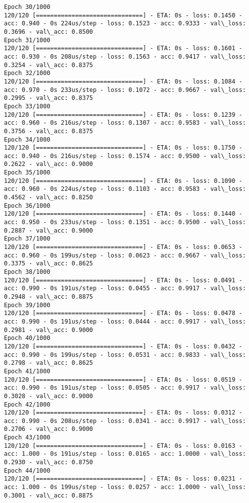 \documentclass[11pt]{article}
\begin{document}
\begin{Verbatim}[commandchars=\\\{\}]
Epoch 30/1000
120/120 [==============================] - ETA: 0s - loss: 0.1450 - acc: 0.940 - 0s 224us/step - loss: 0.1523 - acc: 0.9333 - val\_loss: 0.3696 - val\_acc: 0.8500
Epoch 31/1000
120/120 [==============================] - ETA: 0s - loss: 0.1601 - acc: 0.930 - 0s 208us/step - loss: 0.1563 - acc: 0.9417 - val\_loss: 0.3254 - val\_acc: 0.8375
Epoch 32/1000
120/120 [==============================] - ETA: 0s - loss: 0.1084 - acc: 0.970 - 0s 233us/step - loss: 0.1072 - acc: 0.9667 - val\_loss: 0.2995 - val\_acc: 0.8375
Epoch 33/1000
120/120 [==============================] - ETA: 0s - loss: 0.1239 - acc: 0.960 - 0s 216us/step - loss: 0.1307 - acc: 0.9583 - val\_loss: 0.3756 - val\_acc: 0.8375
Epoch 34/1000
120/120 [==============================] - ETA: 0s - loss: 0.1750 - acc: 0.940 - 0s 216us/step - loss: 0.1574 - acc: 0.9500 - val\_loss: 0.2622 - val\_acc: 0.9000
Epoch 35/1000
120/120 [==============================] - ETA: 0s - loss: 0.1090 - acc: 0.960 - 0s 224us/step - loss: 0.1103 - acc: 0.9583 - val\_loss: 0.4562 - val\_acc: 0.8250
Epoch 36/1000
120/120 [==============================] - ETA: 0s - loss: 0.1440 - acc: 0.950 - 0s 233us/step - loss: 0.1351 - acc: 0.9500 - val\_loss: 0.2887 - val\_acc: 0.9000
Epoch 37/1000
120/120 [==============================] - ETA: 0s - loss: 0.0653 - acc: 0.960 - 0s 199us/step - loss: 0.0623 - acc: 0.9667 - val\_loss: 0.3375 - val\_acc: 0.8625
Epoch 38/1000
120/120 [==============================] - ETA: 0s - loss: 0.0491 - acc: 0.990 - 0s 191us/step - loss: 0.0455 - acc: 0.9917 - val\_loss: 0.2948 - val\_acc: 0.8875
Epoch 39/1000
120/120 [==============================] - ETA: 0s - loss: 0.0478 - acc: 0.990 - 0s 191us/step - loss: 0.0444 - acc: 0.9917 - val\_loss: 0.2981 - val\_acc: 0.9000
Epoch 40/1000
120/120 [==============================] - ETA: 0s - loss: 0.0432 - acc: 0.990 - 0s 199us/step - loss: 0.0531 - acc: 0.9833 - val\_loss: 0.2798 - val\_acc: 0.8625
Epoch 41/1000
120/120 [==============================] - ETA: 0s - loss: 0.0519 - acc: 0.990 - 0s 191us/step - loss: 0.0505 - acc: 0.9917 - val\_loss: 0.3028 - val\_acc: 0.9000
Epoch 42/1000
120/120 [==============================] - ETA: 0s - loss: 0.0312 - acc: 0.990 - 0s 208us/step - loss: 0.0341 - acc: 0.9917 - val\_loss: 0.2706 - val\_acc: 0.9000
Epoch 43/1000
120/120 [==============================] - ETA: 0s - loss: 0.0163 - acc: 1.000 - 0s 191us/step - loss: 0.0165 - acc: 1.0000 - val\_loss: 0.2930 - val\_acc: 0.8750
Epoch 44/1000
120/120 [==============================] - ETA: 0s - loss: 0.0231 - acc: 1.000 - 0s 199us/step - loss: 0.0257 - acc: 1.0000 - val\_loss: 0.3001 - val\_acc: 0.8875

\end{Verbatim}
\end{document}

